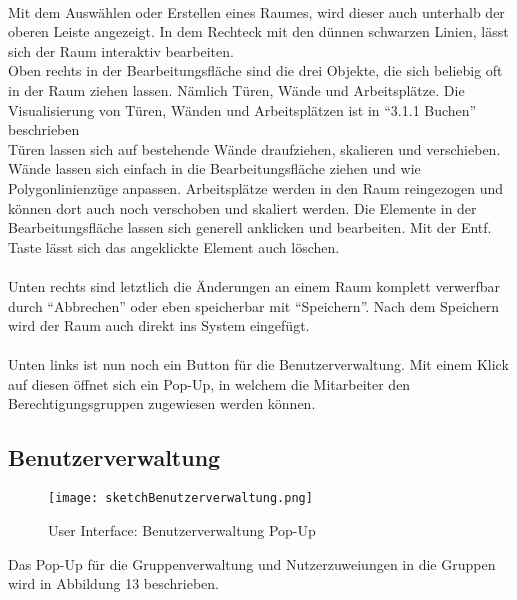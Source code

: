\paragraph{}Mit dem Auswählen oder Erstellen eines Raumes, wird dieser auch unterhalb der oberen Leiste angezeigt. 
In dem Rechteck mit den dünnen schwarzen Linien, lässt sich der Raum interaktiv bearbeiten.
\\
Oben rechts in der Bearbeitungsfläche sind die drei Objekte, die sich beliebig oft in der Raum ziehen lassen.
Nämlich Türen, Wände und Arbeitsplätze.
Die Visualisierung von Türen, Wänden und Arbeitsplätzen ist in "`3.1.1 Buchen"' beschrieben
\\
Türen lassen sich auf bestehende Wände draufziehen, skalieren und verschieben.
Wände lassen sich einfach in die Bearbeitungsfläche ziehen und wie Polygonlinienzüge anpassen.
Arbeitsplätze werden in den Raum reingezogen und können dort auch noch verschoben und skaliert werden.
Die Elemente in der Bearbeitungsfläche lassen sich generell anklicken und bearbeiten.
Mit der Entf. Taste lässt sich das angeklickte Element auch löschen.

\paragraph{} Unten rechts sind letztlich die Änderungen an einem Raum komplett verwerfbar durch "`Abbrechen"'
oder eben speicherbar mit "`Speichern"'.
Nach dem Speichern wird der Raum auch direkt ins System eingefügt.

\paragraph{} Unten links ist nun noch ein Button für die Benutzerverwaltung.
Mit einem Klick auf diesen öffnet sich ein Pop-Up, in welchem die Mitarbeiter den Berechtigungsgruppen zugewiesen werden können.

\newpage
\subsection{Benutzerverwaltung}

\begin{wrapfigure}[20]{r}{5.5cm}
  \texttt{[image: sketchBenutzerverwaltung.png]}
  \caption{User Interface: Benutzerverwaltung Pop-Up}
\end{wrapfigure}

Das Pop-Up für die Gruppenverwaltung und Nutzerzuweiungen in die Gruppen wird in Abbildung 13 beschrieben.
\\
